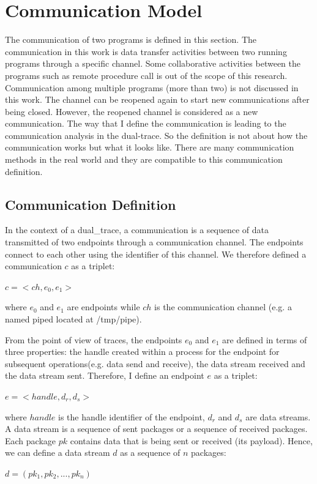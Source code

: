 \section{Communication Model}\label{definition}
The communication of two programs is defined in this section. The communication in this work is data transfer activities between two running programs through a specific channel. Some collaborative activities between the programs such as remote procedure call is out of the scope of this research. Communication among multiple programs (more than two) is not discussed in this work. The channel can be reopened again to start new communications after being closed. However, the reopened channel is considered as a new communication. The way that I define the communication is leading to the communication analysis in the dual-trace. So the definition is not about how the communication works but what it looks like. There are many communication methods in the real world and they are compatible to this communication definition. 

\subsection{Communication Definition}
In the context of a dual\_trace, a communication is a sequence of data transmitted of two endpoints through a communication channel. The endpoints connect to each other using the identifier of this channel. We therefore defined a communication $c$ as a triplet:

$c =<ch, e_0, e_1>$

where $e_0$ and $e_1$ are endpoints while $ch$ is the communication channel (e.g. a named piped located at /tmp/pipe).

From the point of view of traces, the endpoints $e_0$ and $e_1$ are defined in terms of three properties: the handle created within a process for the endpoint for subsequent operations(e.g. data send and receive), the data stream received and the data stream sent. Therefore, I define an endpoint $e$ as a triplet:

$ e =<handle, d_r, d_s>$

where $handle$ is the handle identifier of the endpoint, $d_r$ and $d_s$ are data streams. A data stream is a sequence of sent packages or a sequence of received packages. Each package $pk$ contains data that is being sent or received (its payload). Hence, we can define a data stream $d$ as a sequence of $n$ packages:

$ d = (pk_1, pk_2, ..., pk_n)$ 

